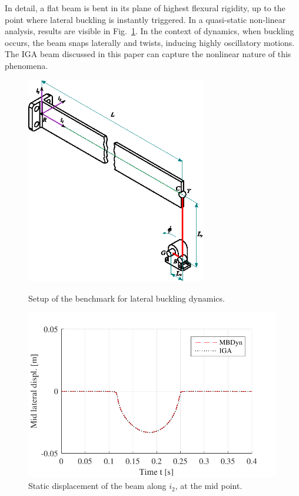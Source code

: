 \documentclass[review]{elsarticle}
\begin{document}
In detail, a flat beam is bent in its plane of highest flexural rigidity, up to the point where lateral buckling is instantly triggered. In a quasi-static non-linear analysis,  
results are visible in Fig.~\ref{figB2static}. In the context of dynamics, when buckling occurs, the beam snaps laterally and twists, inducing highly oscillatory motions. The IGA beam discussed in this paper can capture the nonlinear nature of this phenomena.

\begin{figure}%
 \begin{minipage}[b]{0.48\linewidth}
    \centering
    \includegraphics[width=0.70\textwidth]{benchmark_buckling/setup_buckling.eps}
    \caption{Setup of the benchmark for lateral buckling dynamics.}
    \label{figB2setup}
 \end{minipage}
 \hspace{0.4cm}
 \begin{minipage}[b]{0.48\linewidth}
    \centering
    \includegraphics[width=0.99\textwidth]{benchmark_buckling/benchmark_buckling_disp_static.pdf}
    \caption{Static displacement of the beam along $i_2$, at the mid point.}
    \label{figB2static}
 \end{minipage}
\end{figure}
\end{document}
